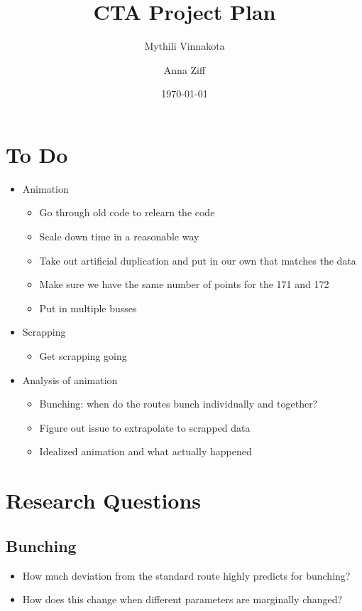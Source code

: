 \documentclass{article}
\begin{document}
\title{CTA Project Plan}
\author{Mythili Vinnakota \and Anna Ziff}
\date{\today}
\maketitle

\section{To Do}

\begin{itemize}

\item Animation
\begin{itemize}
	\item Go through old code to relearn the code
	\item Scale down time in a reasonable way
	\item Take out artificial duplication and put in our own that matches the data
	\item Make sure we have the same number of points for the 171 and 172
	\item Put in multiple busses
\end{itemize}

\item Scrapping
\begin{itemize}
	\item Get scrapping going
\end{itemize}

\item Analysis of animation
\begin{itemize}
	\item Bunching: when do the routes bunch individually and together?
	\item Figure out issue to extrapolate to scrapped data 
	\item Idealized animation and what actually happened
\end{itemize}

\end{itemize}

\section{Research Questions}

\subsection{Bunching}
\begin{itemize}
	\item How much deviation from the standard route highly predicts for bunching?
	\item How does this change when different parameters are marginally changed?
\end{itemize}
\end{document}
